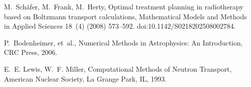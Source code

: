 \documentclass[xchauthor,chkrefs,fixeqskip,GCNS,amsmath,amsthm]{yjcphg}
\theoremstyle{remark}
\begin{document}
\begin{backmatter}
\begin{thebibliography}{}
\begin{bsubitem}
\begin{bcontribution}%
\end{bcontribution}
\begin{bhost}
\begin{bissue}
\end{bissue}
\end{bhost}
\end{bsubitem}
%
\OrigBibText
M.~Sch\"afer, M.~Frank, M.~Herty, Optimal treatment planning in
radiotherapy based on {B}oltzmann transport calculations, Mathematical
Models and Methods in Applied Sciences 18~(4) (2008) 573--592.
\newblock
doi:10.1142/S0218202508002784.
\endOrigBibText
{}%
\endbibitem

\begin{bsubitem}
\begin{bcontribution}%
 \betal
{}
\end{bcontribution}
\begin{bhost}
\begin{bbook}
\end{bbook}
\end{bhost}
\end{bsubitem}
%
\OrigBibText
P.~Bodenheimer, et~al., Numerical Methods in Astrophysics: An
Introduction, CRC Press, 2006.
\endOrigBibText
{}%
\endbibitem

\begin{bsubitem}
\begin{bcontribution}%
\end{bcontribution}
\begin{bhost}
\begin{bbook}
\end{bbook}
\end{bhost}
\end{bsubitem}
%
\OrigBibText
E.~E. Lewis, W.~F. Miller, Computational Methods of Neutron Transport,
American Nuclear Society, La Grange Park, IL, 1993.
\endOrigBibText
{}%
\endbibitem


\end{thebibliography}
\end{backmatter}
\end{document}
